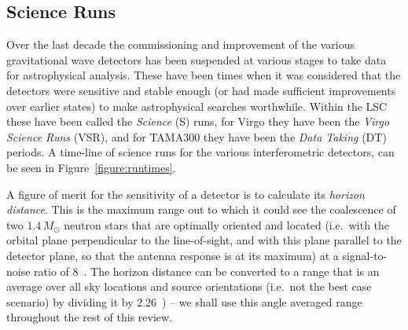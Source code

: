 \documentclass{article}
\begin{document}
\subsection{Science Runs}
\label{subsection:runs}

Over the last decade the commissioning and improvement of the various
gravitational wave detectors has been suspended at various stages to take data
for astrophysical analysis. These have been times when it was considered that
the detectors were sensitive and stable enough (or had made sufficient
improvements over earlier states) to make astrophysical searches worthwhile.
Within the LSC these have been called the \textit{Science} (S) runs, for Virgo they
have been the \textit{Virgo Science Runs} (VSR), and for TAMA300 they have been
the \textit{Data Taking} (DT) periods. A time-line of science runs for the various
interferometric detectors, can be seen in Figure~\ref{figure:runtimes}.


A figure of merit for the sensitivity of a detector is to calculate
its \textit{horizon distance}. This is the maximum range out to which
it could see the coalescence of two $1.4\,M_{\odot}$ neutron stars
that are optimally oriented and located (i.e.~with the orbital plane
perpendicular to the line-of-sight, and with this plane parallel to
the detector plane, so that the antenna response is at its maximum) at
a signal-to-noise ratio of 8~\cite{Abbott:2005b}. The horizon distance
can be converted to a range that is an average over all sky locations
and source orientations (i.e.~not the best case scenario) by dividing
it by 2.26~\cite{Sutton:2003}) -- we shall use this angle averaged
range throughout the rest of this review.
\end{document}
